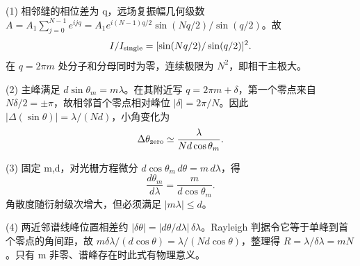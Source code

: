 (1) 相邻缝的相位差为 q，远场复振幅几何级数 \(A=A_1\sum_{j=0}^{N-1}e^{ijq}=A_1e^{i(N-1)q/2}\sin(Nq/2)/\sin(q/2)\)。故
\[
I/I_{\rm single}=[\sin(Nq/2)/\sin(q/2)]^2.
\]
在 \(q=2\pi m\) 处分子和分母同时为零，连续极限为 \(N^2\)，即相干主极大。

(2) 主峰满足 \(d\sin\theta_m=m\lambda\)。在其附近写 \(q=2\pi m+\delta\)，第一个零点来自 \(N\delta/2=\pm\pi\)，故相邻首个零点相对峰位 \(|\delta|=2\pi/N\)。因此 \(|\Delta(\sin\theta)|=\lambda/(Nd)\)，小角变化为
\[
\Delta\theta_{\rm zero}\simeq\frac{\lambda}{Nd\cos\theta_m}.
\]

(3) 固定 m,d，对光栅方程微分 \(d\cos\theta_m\,d\theta=m\,d\lambda\)，得
\[
\frac{d\theta_m}{d\lambda}=\frac{m}{d\cos\theta_m}.
\]
角散度随衍射级次增大，但必须满足 \(|m\lambda|\le d\)。

(4) 两近邻谱线峰位置相差约 \(|\delta\theta|=|d\theta/d\lambda|\,\delta\lambda\)。Rayleigh 判据令它等于单峰到首个零点的角间距，故 \(m\delta\lambda/(d\cos\theta)=\lambda/(Nd\cos\theta)\)，整理得 \(R=\lambda/\delta\lambda=mN\)。只有 m 非零、谱峰存在时此式有物理意义。

